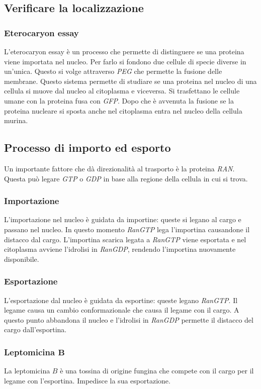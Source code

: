 	\subsection{Verificare la localizzazione}

		\subsubsection{Eterocaryon essay}
		L'eterocaryon essay \`e un processo che permette di distinguere se una proteina viene importata nel nucleo.
		Per farlo si fondono due cellule di specie diverse in un'unica.
		Questo si volge attraverso \emph{PEG} che permette la fusione delle membrane.
		Questo sistema permette di studiare se una proteina nel nucleo di una cellula si muove dal nucleo al citoplasma e viceversa.
		Si trasfettano le cellule umane con la proteina fusa con \emph{GFP}.
		Dopo che \`e avvenuta la fusione se la proteina nucleare si sposta anche nel citoplasma entra nel nucleo della cellula murina.

	\subsection{Processo di importo ed esporto}
	Un importante fattore che d\`a direzionalit\`a al trasporto \`e la proteina \emph{RAN}.
	Questa pu\`o legare \emph{GTP} o \emph{GDP} in base alla regione della cellula in cui si trova.

		\subsubsection{Importazione}
		L'importazione nel nucleo \`e guidata da importine: queste si legano al cargo e passano nel nucleo.
		In questo momento \emph{RanGTP} lega l'importina causandone il distacco dal cargo.
		L'importina scarica legata a \emph{RanGTP} viene esportata e nel citoplasma avviene l'idrolisi in \emph{RanGDP}, rendendo l'importina nuovamente disponibile.

		\subsubsection{Esportazione}
		L'esportazione dal nucleo \`e guidata da esportine: queste legano \emph{RanGTP}.
		Il legame causa un cambio conformazionale che causa il legame con il cargo.
		A questo punto abbandona il nucleo e l'idrolisi in \emph{RanGDP} permette il distacco del cargo dall'esportina.

		\subsubsection{Leptomicina $\mathbf{B}$}
		La leptomicina $B$ \`e una tossina di origine fungina che compete con il cargo per il legame con l'esportina.
		Impedisce la sua esportazione.

